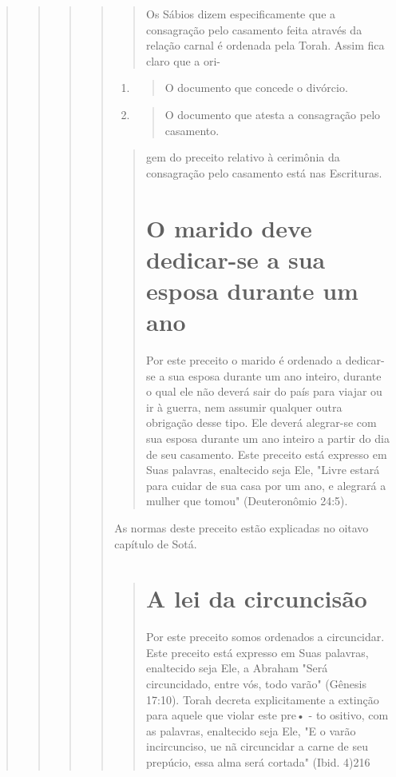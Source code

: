 \begin{quote}
\begin{quote}
\begin{quote}
\begin{quote}
\begin{quote}
Os Sábios dizem especificamente que a consagração pelo casamento feita
através da relação carnal é ordenada pela Torah. Assim fica claro que a
ori-
\end{quote}

\begin{enumerate}
\def\labelenumi{\arabic{enumi}.}
\setcounter{enumi}{213}
\item
 \begin{quote}
 O documento que concede o divórcio.
 \end{quote}
\item
 \begin{quote}
 O documento que atesta a consagração pelo casamento.
 \end{quote}
\end{enumerate}

\begin{quote}


gem do preceito relativo à cerimônia da consagração pelo casamento está
nas Escrituras.

\section{O marido deve dedicar-se a sua esposa durante um ano}

Por este preceito o marido é ordenado a dedicar-se a sua esposa du­rante
um ano inteiro, durante o qual ele não deverá sair do país para viajar
ou ir à guerra, nem assumir qualquer outra obrigação desse tipo. Ele
deverá alegrar-se com sua esposa durante um ano inteiro a partir do dia
de seu casamento. Este preceito está expresso em Suas palavras,
enaltecido seja Ele, "Livre estará para cuidar de sua casa por um ano, e
alegrará a mulher que tomou" (Deutero­nômio 24:5).
\end{quote}

As normas deste preceito estão explicadas no oitavo capítulo de Sotá.

\begin{quote}
\section{A lei da circuncisão}

Por este preceito somos ordenados a circuncidar. Este preceito está
expresso em Suas palavras, enaltecido seja Ele, a Abraham "Será
circuncidado, entre vós, todo varão" (Gênesis 17:10). Torah decreta
explicitamente a ex­tinção para aquele que violar este pre• - to
ositivo, com as palavras, enalteci­do seja Ele, "E o varão incircunciso,
ue nã circuncidar a carne de seu prepú­cio, essa alma será cortada"
(Ibid. 4)216


\end{quote}
\end{quote}
\end{quote}
\end{quote}
\end{quote}
